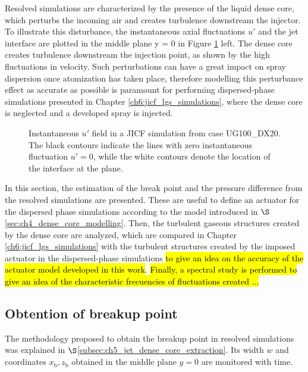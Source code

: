 Resolved simulations are characterized by the presence of the liquid dense core, which perturbs the incoming air and creates turbulence downstream the injector. To illustrate this disturbance, the instantaneous axial fluctuations $u'$ and the jet interface are plotted in the middle plane y = 0 in Figure \ref{fig:results_dense_core_modeling_up_field} left. The dense core creates turbulence downstream the injection point, as shown by the high fluctuations in velocity. Such perturbations can have a great impact on spray dispersion once atomization has taken place, therefore modelling this perturbance effect as accurate as possible is paramount for performing dispersed-phase simulations presented in Chapter \ref{ch6:jicf_lgs_simulations}, where the dense core is neglected and a developed spray is injected.

\begin{figure}[ht]
\centering
{}
\caption[Perturbation effect of the liquid dense core in the gaseous field.]{Instantaneous $u'$ field in a JICF simulation from case UG100\_DX20. The black contours indicate the lines with zero instantaneous fluctuation $u' = 0$, while the white contours denote the location of the interface at the plane.}
\label{fig:results_dense_core_modeling_up_field}
\end{figure}

In this section, the estimation of the break point and the pressure difference from the resolved simulations are presented. These are useful to define an actuator for the dispersed phase simulations according to the model introduced in $\S$\ref{sec:ch4_dense_core_modelling}. Then, the turbulent gaseous structures created by the dense core are analyzed, which are compared in Chapter \ref{ch6:jicf_lgs_simulations} with the turbulent structures created by the imposed actuator in the dispersed-phase simulations \hl{to give an idea on the accuracy of the actuator model developed in this work}. \hl{Finally, a spectral study is performed to give an idea of the characteristic frecuencies of fluctuations created ...}


\subsection{Obtention of breakup point}

The methodology proposed to obtain the breakup point in resolved simulations was explained in $\S$\ref{subsec:ch5_jet_dense_core_extraction}. Its width $w$ and coordinates $x_\mathrm{b}, z_\mathrm{b}$ obtained in the middle plane $y = 0$ are monitored with time. 

